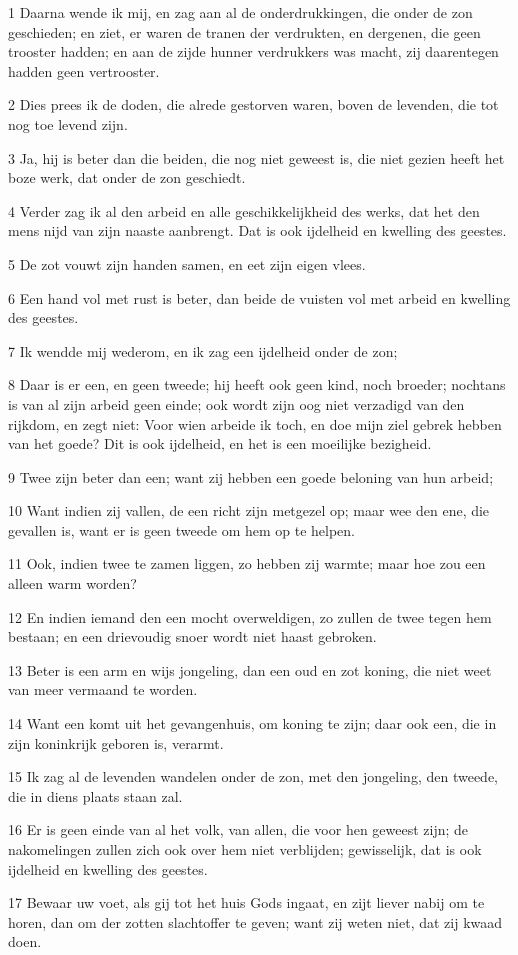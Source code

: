 \par 1 Daarna wende ik mij, en zag aan al de onderdrukkingen, die onder de zon geschieden; en ziet, er waren de tranen der verdrukten, en dergenen, die geen trooster hadden; en aan de zijde hunner verdrukkers was macht, zij daarentegen hadden geen vertrooster.
\par 2 Dies prees ik de doden, die alrede gestorven waren, boven de levenden, die tot nog toe levend zijn.
\par 3 Ja, hij is beter dan die beiden, die nog niet geweest is, die niet gezien heeft het boze werk, dat onder de zon geschiedt.
\par 4 Verder zag ik al den arbeid en alle geschikkelijkheid des werks, dat het den mens nijd van zijn naaste aanbrengt. Dat is ook ijdelheid en kwelling des geestes.
\par 5 De zot vouwt zijn handen samen, en eet zijn eigen vlees.
\par 6 Een hand vol met rust is beter, dan beide de vuisten vol met arbeid en kwelling des geestes.
\par 7 Ik wendde mij wederom, en ik zag een ijdelheid onder de zon;
\par 8 Daar is er een, en geen tweede; hij heeft ook geen kind, noch broeder; nochtans is van al zijn arbeid geen einde; ook wordt zijn oog niet verzadigd van den rijkdom, en zegt niet: Voor wien arbeide ik toch, en doe mijn ziel gebrek hebben van het goede? Dit is ook ijdelheid, en het is een moeilijke bezigheid.
\par 9 Twee zijn beter dan een; want zij hebben een goede beloning van hun arbeid;
\par 10 Want indien zij vallen, de een richt zijn metgezel op; maar wee den ene, die gevallen is, want er is geen tweede om hem op te helpen.
\par 11 Ook, indien twee te zamen liggen, zo hebben zij warmte; maar hoe zou een alleen warm worden?
\par 12 En indien iemand den een mocht overweldigen, zo zullen de twee tegen hem bestaan; en een drievoudig snoer wordt niet haast gebroken.
\par 13 Beter is een arm en wijs jongeling, dan een oud en zot koning, die niet weet van meer vermaand te worden.
\par 14 Want een komt uit het gevangenhuis, om koning te zijn; daar ook een, die in zijn koninkrijk geboren is, verarmt.
\par 15 Ik zag al de levenden wandelen onder de zon, met den jongeling, den tweede, die in diens plaats staan zal.
\par 16 Er is geen einde van al het volk, van allen, die voor hen geweest zijn; de nakomelingen zullen zich ook over hem niet verblijden; gewisselijk, dat is ook ijdelheid en kwelling des geestes.
\par 17 Bewaar uw voet, als gij tot het huis Gods ingaat, en zijt liever nabij om te horen, dan om der zotten slachtoffer te geven; want zij weten niet, dat zij kwaad doen.


